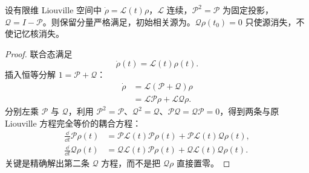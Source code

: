 \begin{theorem}[含初始相关源的精确投影消元]
设有限维 Liouville 空间中 $\dot\rho=\mathcal L(t)\rho$，$\mathcal L$ 连续，$\mathcal P^2=\mathcal P$ 为固定投影，$\mathcal Q=I-\mathcal P$。则保留分量严格满足，初始相关源为。$\mathcal Q\rho(t_0)=0$ 只使源消失，不使记忆核消失。
\end{theorem}
\begin{proof}
联合态满足
\begin{equation*}
 \dot\rho(t)=\mathcal L(t)\rho(t).
\end{equation*}
插入恒等分解 $1=\mathcal P+\mathcal Q$：
\begin{align*}
 \dot\rho
 &=\mathcal L(\mathcal P+\mathcal Q)\rho\\
 &=\mathcal L\mathcal P\rho+\mathcal L\mathcal Q\rho.
\end{align*}
分别左乘 $\mathcal P$ 与 $\mathcal Q$，利用 $\mathcal P^2=\mathcal P$、$\mathcal Q^2=\mathcal Q$、$\mathcal P\mathcal Q=\mathcal Q\mathcal P=0$，得到两条与原 Liouville 方程完全等价的耦合方程：
\begin{align*}
 \frac{\dd}{\dd t}\mathcal P\rho(t)
 &=\mathcal P\mathcal L(t)\mathcal P\rho(t)
 +\mathcal P\mathcal L(t)\mathcal Q\rho(t),\\
 \frac{\dd}{\dd t}\mathcal Q\rho(t)
 &=\mathcal Q\mathcal L(t)\mathcal P\rho(t)
 +\mathcal Q\mathcal L(t)\mathcal Q\rho(t).
\end{align*}
关键是精确解出第二条 $\mathcal Q$ 方程，而不是把 $\mathcal Q\rho$ 直接置零。


\end{proof}

